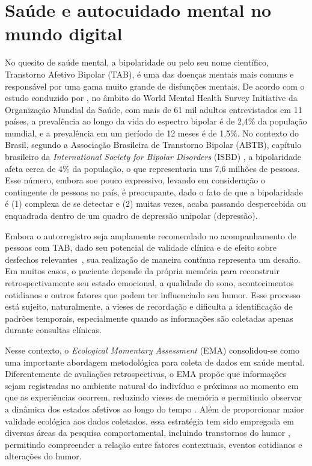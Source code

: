 \chapter{Saúde e autocuidado mental no mundo digital}


No quesito de saúde mental, a bipolaridade ou pelo seu nome científico,
Transtorno Afetivo Bipolar (TAB), é uma das doenças mentais mais comuns e
responsável por uma gama muito grande de disfunções mentais. De acordo com
o estudo conduzido por \citet{Merikangas2011}, no âmbito do World Mental
Health Survey Initiative da Organização Mundial da Saúde, com mais de 61 mil
adultos entrevistados em 11 países, a prevalência ao longo da vida do espectro
bipolar é de 2,4\% da população mundial, e a prevalência em um período de 12
meses é de 1,5\%. No contexto do Brasil, segundo a Associação Brasileira de
Transtorno Bipolar (ABTB), capítulo brasileiro da \textit{International Society for
Bipolar Disorders} (ISBD) \citep{abtb}, a bipolaridade afeta cerca de
4\% da população, o que representaria uns 7,6 milhões de
pessoas. Esse número, embora soe pouco expressivo, levando em consideração o
contingente de pessoas no país, é preocupante, dado o fato de que a
bipolaridade é (1) complexa de se detectar e (2) muitas vezes, acaba passando
despercebida ou enquadrada dentro de um quadro de depressão unipolar
(depressão).

Embora o autorregistro seja amplamente recomendado no acompanhamento
de pessoas com TAB, dado seu potencial de validade clínica e de efeito
sobre desfechos relevantes~\cite{Faurholt:2016}, sua realização de
maneira contínua representa um desafio.
Em muitos casos, o paciente depende da própria memória para reconstruir
retrospectivamente seu estado emocional, a qualidade do sono,
acontecimentos cotidianos e outros fatores que podem ter influenciado
seu humor. Esse processo está sujeito, naturalmente, a vieses de
recordação e dificulta a identificação de padrões temporais, especialmente
quando as informações são coletadas apenas durante consultas clínicas.

Nesse contexto, o \textit{Ecological Momentary Assessment} (EMA)
consolidou-se como uma importante abordagem metodológica para coleta
de dados em saúde mental. Diferentemente de avaliações retrospectivas,
o EMA propõe que informações sejam registradas no ambiente natural do
indivíduo e próximas ao momento em que as experiências ocorrem, reduzindo
vieses de memória e permitindo observar a dinâmica dos estados afetivos
ao longo do tempo \citep{EbnerPriemer2009}. Além de proporcionar maior
validade ecológica aos dados coletados, essa estratégia tem sido
empregada em diversas áreas da pesquisa comportamental, incluindo
transtornos do humor \citep{Collins2003, EbnerPriemer2009}, permitindo
compreender a relação entre fatores contextuais, eventos cotidianos e
alterações do humor.

